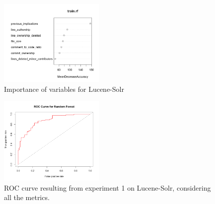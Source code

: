 \begin{figure}
    \centering
    \includegraphics[width=0.45\textwidth]{images/lucene_importance_2.png}
    \caption{Importance of variables for Lucene-Solr}
    \label{fig:importance_var_lucene}
\end{figure}






\begin{figure}[ht]
    \centering
    \includegraphics[width=0.45\textwidth]{images/ROC_lucene_05_all.png}
    \caption{ROC curve resulting from experiment 1 on Lucene-Solr, considering all the metrics.}
    \label{fig:roc_lucene}
\end{figure}


